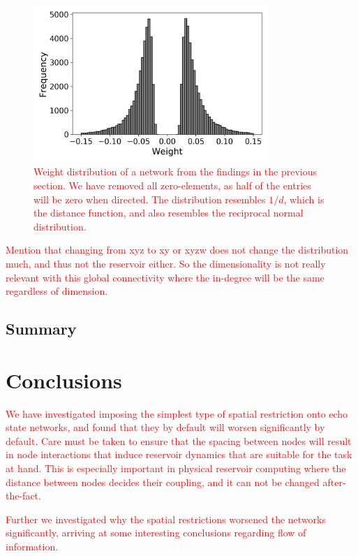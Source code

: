 \begin{figure}[t]
  \centering
  \includegraphics[width=3.5in]{figures/rgg-dist.png}
  \caption{
    \textcolor{red}{
      Weight distribution of a network from the findings in the previous
section. We have removed all zero-elements, as half of the entries will be zero
when directed. The distribution resembles $1/d$, which is the distance function,
and also resembles the reciprocal normal distribution.
    }
  }
  \label{fig:rgg-dist}
\end{figure}

\textcolor{red}{
  Mention that changing from xyz to xy or xyzw does not change the distribution
much, and thus not the reservoir either. So the dimensionality is not really
relevant with this global connectivity where the in-degree will be the same
regardless of dimension.
}

\subsection{Summary}

\section{Conclusions}

\textcolor{red}{
  We have investigated imposing the simplest type of spatial restriction onto
echo state networks, and found that they by default will worsen significantly by
default. Care must be taken to ensure that the spacing between nodes will result
in node interactions that induce reservoir dynamics that are suitable for the
task at hand. This is especially important in physical reservoir computing where
the distance between nodes decides their coupling, and it can not be changed
after-the-fact.
}

\textcolor{red}{
  Further we investigated why the spatial restrictions worsened the networks
significantly, arriving at some interesting conclusions regarding flow of
information.
}

